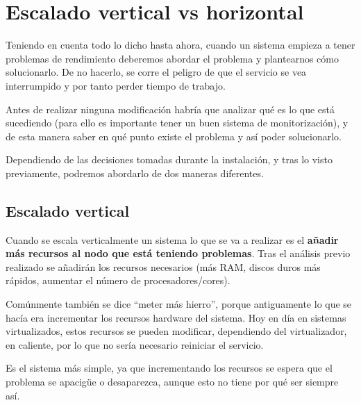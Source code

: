 \chapter{Escalado vertical vs horizontal}

Teniendo en cuenta todo lo dicho hasta ahora, cuando un sistema empieza a tener problemas de rendimiento deberemos abordar el problema y plantearnos cómo solucionarlo. De no hacerlo, se corre el peligro de que el servicio se vea interrumpido y por tanto perder tiempo de trabajo.

Antes de realizar ninguna modificación habría que analizar qué es lo que está sucediendo (para ello es importante tener un buen sistema de monitorización), y de esta manera saber en qué punto existe el problema y así poder solucionarlo.

Dependiendo de las decisiones tomadas durante la instalación, y tras lo visto previamente, podremos abordarlo de dos maneras diferentes.

\section{Escalado vertical}

Cuando se escala verticalmente un sistema lo que se va a realizar es el \textbf{añadir más recursos al nodo que está teniendo problemas}. Tras el análisis previo realizado se añadirán los recursos necesarios (más RAM, discos duros más rápidos, aumentar el número de procesadores/cores).

Comúnmente también se dice “meter más hierro”, porque antiguamente lo que se hacía era incrementar los recursos hardware del sistema. Hoy en día en sistemas virtualizados, estos recursos se pueden modificar, dependiendo del virtualizador, en caliente, por lo que no sería necesario reiniciar el servicio.

Es el sistema más simple, ya que incrementando los recursos se espera que el problema se apacigüe o desaparezca, aunque esto no tiene por qué ser siempre así.

